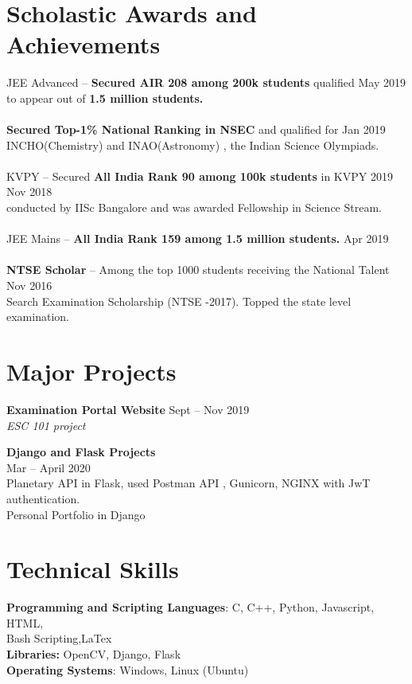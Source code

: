 \documentclass[margin,line]{res}
\begin{document}
\begin{resume}
\section{\sc \large Scholastic Awards and Achievements}
JEE Advanced -- {\bf Secured AIR 208 among 200k students} qualified \hfill May 2019 \\ to appear out of {\bf 1.5 million students.}\\ \\
{\bf Secured Top-1\% National Ranking in NSEC} and qualified for \hfill Jan 2019\\ INCHO(Chemistry) and  INAO(Astronomy) , the Indian Science Olympiads.\\ \\
KVPY -- Secured {\bf All India Rank 90 among 100k students} in KVPY 2019 \hfill Nov 2018\\conducted by IISc Bangalore and was awarded Fellowship in Science Stream.\\ \\
JEE Mains -- {\bf All India Rank 159 among 1.5 million students. }\hfill Apr 2019 \\ \\
{\bf NTSE Scholar} -- Among the top 1000 students receiving the National Talent \hfill Nov 2016\\ Search Examination Scholarship (NTSE -2017). Topped the state level examination. \\

\section{\sc \large Major Projects}
{\bf Examination Portal Website} \hfill Sept -- Nov 2019\\ 
{\it ESC 101 project}

{\bf Django and Flask Projects}\\\hfill Mar -- April 2020\\ 
Planetary API in Flask, used Postman API , Gunicorn, NGINX with JwT authentication.\\
Personal Portfolio in Django\\

\section{\sc \large Technical Skills}
{\bf Programming and Scripting Languages}:  C, C++, Python, Javascript, HTML,\\ Bash Scripting,LaTex\\
{\bf Libraries:} OpenCV, Django, Flask\\
{\bf Operating Systems}: Windows, Linux (Ubuntu)\\

\end{resume}
\end{document}

